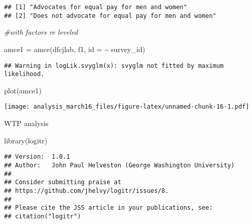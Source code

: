 \documentclass[
]{article}
\newenvironment{Shaded}{\begin{snugshade}}{\end{snugshade}}
\newcommand{\AttributeTok}[1]{\textcolor[rgb]{0.77,0.63,0.00}{#1}}
\newcommand{\CommentTok}[1]{\textcolor[rgb]{0.56,0.35,0.01}{\textit{#1}}}
\newcommand{\FunctionTok}[1]{\textcolor[rgb]{0.00,0.00,0.00}{#1}}
\newcommand{\NormalTok}[1]{#1}
\newcommand{\OtherTok}[1]{\textcolor[rgb]{0.56,0.35,0.01}{#1}}
\newcommand{\SpecialCharTok}[1]{\textcolor[rgb]{0.00,0.00,0.00}{#1}}
\begin{document}
\begin{verbatim}
## [1] "Advocates for equal pay for men and women"        
## [2] "Does not advocate for equal pay for men and women"
\end{verbatim}

\begin{Shaded}
\begin{Highlighting}[]
\CommentTok{\#with factors re leveled}

\NormalTok{amce1 }\OtherTok{=} \FunctionTok{amce}\NormalTok{(dfcjlab, f1, }\AttributeTok{id =} \SpecialCharTok{\textasciitilde{}}\NormalTok{ survey\_id)}
\end{Highlighting}
\end{Shaded}

\begin{verbatim}
## Warning in logLik.svyglm(x): svyglm not fitted by maximum likelihood.
\end{verbatim}

\begin{Shaded}
\begin{Highlighting}[]
\FunctionTok{plot}\NormalTok{(amce1)}
\end{Highlighting}
\end{Shaded}

\texttt{[image: analysis\_march16\_files/figure-latex/unnamed-chunk-16-1.pdf]}

WTP analysis

\begin{Shaded}
\begin{Highlighting}[]
\FunctionTok{library}\NormalTok{(logitr)}
\end{Highlighting}
\end{Shaded}

\begin{verbatim}
## Version:  1.0.1
## Author:   John Paul Helveston (George Washington University)
## 
## Consider submitting praise at
## https://github.com/jhelvy/logitr/issues/8.
## 
## Please cite the JSS article in your publications, see:
## citation("logitr")
\end{verbatim}
\end{document}
